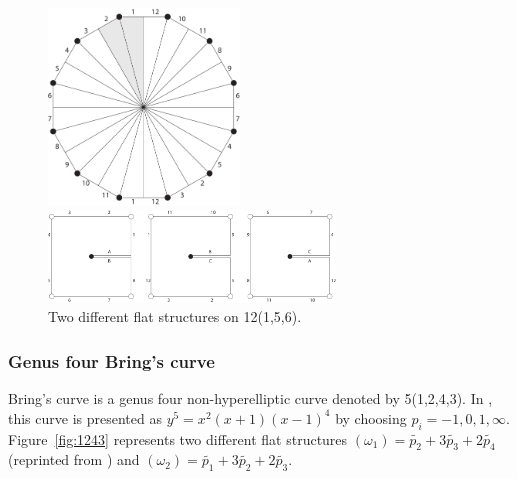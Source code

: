 \documentclass[12pt,reqno]{amsart}
\theoremstyle{definition}
\theoremstyle{remark}
\begin{document}
\begin{figure}[htbp]
\centering
\begin{minipage}{0.5\textwidth}
  \centering
  \includegraphics[width=2in]{figures/156_flat.pdf}
\end{minipage}%
\begin{minipage}{0.5\textwidth}
  \centering
  \includegraphics[width=3in]{figures/156_flat_2.pdf}
\end{minipage}
  \caption{Two different flat structures on 12(1,5,6).}
  \label{fig:156}
\end{figure}

\subsubsection{Genus four Bring's curve}
Bring's curve is a genus four non-hyperelliptic curve denoted by 5(1,2,4,3). In \cite{matti}, this curve is presented as $y^5 = x^2(x+1)(x-1)^4$ by choosing $p_i = -1, 0, 1, \infty.$ Figure~\ref{fig:1243} represents two different flat structures $(\omega_1) = \widetilde{p_2} + 3 \widetilde{p_3} + 2 \widetilde{p_4}$ (reprinted from \cite{matti}) and $(\omega_2) = \widetilde{p_1} + 3 \widetilde{p_2} + 2 \widetilde{p_3}.$
\end{document}
